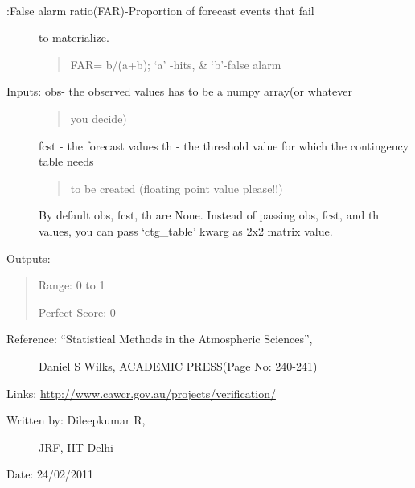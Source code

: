 \documentclass[letterpaper,10pt,english]{sphinxmanual}
\begin{document}

\begin{fulllineitems}
\label{diagnosis:ctgfunction.far}~\begin{description}
\item[{{\hyperref[diagnosis:ctgfunction.far]{}}:False alarm ratio(FAR)-Proportion of forecast events that fail}] \leavevmode
to materialize.
\begin{quote}

FAR= b/(a+b); `a' -hits, \& `b'-false alarm
\end{quote}

\item[{Inputs: obs- the observed values has to be a numpy array(or whatever}] \leavevmode\begin{quote}

you decide)
\end{quote}

fcst - the forecast values
th  - the threshold value for which the contingency table needs
\begin{quote}

to be created (floating point value please!!)
\end{quote}

By default obs, fcst, th are None. Instead of passing obs, fcst,
and th values, you can pass `ctg\_table' kwarg as 2x2 matrix value.

\end{description}

Outputs:
\begin{quote}

Range: 0 to 1

Perfect Score: 0
\end{quote}
\begin{description}
\item[{Reference: ``Statistical Methods in the Atmospheric Sciences'',}] \leavevmode
Daniel S Wilks, ACADEMIC PRESS(Page No: 240-241)

\end{description}

Links: \href{http://www.cawcr.gov.au/projects/verification/}{http://www.cawcr.gov.au/projects/verification/}
\begin{description}
\item[{Written by: Dileepkumar R,}] \leavevmode
JRF, IIT Delhi

\end{description}

Date: 24/02/2011

\end{fulllineitems}
\end{document}
